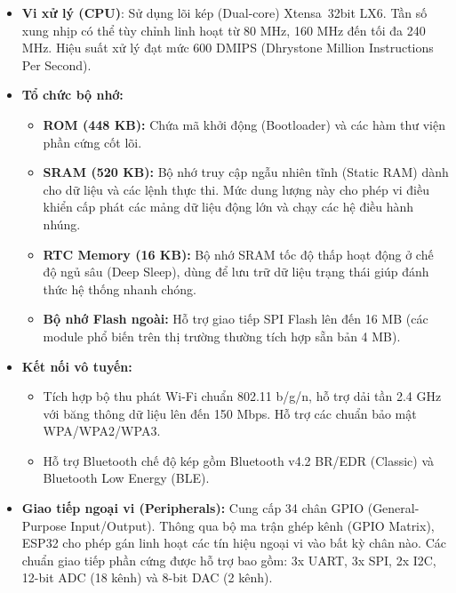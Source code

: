 \documentclass[12pt,a4paper]{report}
\begin{document}
\begin{itemize}

  \item \textbf{Vi xử lý (CPU)}: Sử dụng lõi kép (Dual-core) Xtensa\textregistered\ 32\-bit LX6. Tần số xung nhịp có thể tùy chỉnh linh hoạt từ 80 MHz, 160 MHz đến tối đa 240 MHz. Hiệu suất xử lý đạt mức 600 DMIPS (Dhrystone Million Instructions Per Second).
  
  \item \textbf{Tổ chức bộ nhớ:}

    \begin{itemize}

      \item \textbf{ROM (448 KB):} Chứa mã khởi động (Bootloader) và các hàm thư viện phần cứng cốt lõi.

      \item \textbf{SRAM (520 KB):} Bộ nhớ truy cập ngẫu nhiên tĩnh (Static RAM) dành cho dữ liệu và các lệnh thực thi. Mức dung lượng này cho phép vi điều khiển cấp phát các mảng dữ liệu động lớn và chạy các hệ điều hành nhúng.

      \item \textbf{RTC Memory (16 KB):} Bộ nhớ SRAM tốc độ thấp hoạt động ở chế độ ngủ sâu (Deep Sleep), dùng để lưu trữ dữ liệu trạng thái giúp đánh thức hệ thống nhanh chóng.

      \item \textbf{Bộ nhớ Flash ngoài:} Hỗ trợ giao tiếp SPI Flash lên đến 16 MB (các module phổ biến trên thị trường thường tích hợp sẵn bản 4 MB).

    \end{itemize}
  
\end{itemize}

\begin{itemize}

\item \textbf{Kết nối vô tuyến:}

\begin{itemize}

\item Tích hợp bộ thu phát Wi-Fi chuẩn 802.11 b/g/n, hỗ trợ dải tần 2.4 GHz với băng thông dữ liệu lên đến 150 Mbps. Hỗ trợ các chuẩn bảo mật WPA/WPA2/WPA3.

\item Hỗ trợ Bluetooth chế độ kép gồm Bluetooth v4.2 BR/EDR (Classic) và Bluetooth Low Energy (BLE).

\end{itemize}

\item \textbf{Giao tiếp ngoại vi (Peripherals):} Cung cấp 34 chân GPIO (General-Purpose Input/Output). Thông qua bộ ma trận ghép kênh (GPIO Matrix), ESP32 cho phép gán linh hoạt các tín hiệu ngoại vi vào bất kỳ chân nào. Các chuẩn giao tiếp phần cứng được hỗ trợ bao gồm: 3x UART, 3x SPI, 2x I2C, 12-bit ADC (18 kênh) và 8-bit DAC (2 kênh).

\end{itemize}
\end{document}
